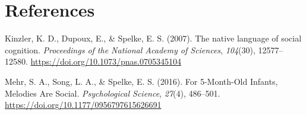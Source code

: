 \documentclass[
  english,
  man]{apa6}
\begin{document}
\newpage

\hypertarget{references}{%
\section{References}\label{references}}

\begingroup
\setlength{\parindent}{-0.5in}
\setlength{\leftskip}{0.5in}

\hypertarget{refs}{}
\leavevmode\hypertarget{ref-kinzler_native_2007}{}%
Kinzler, K. D., Dupoux, E., \& Spelke, E. S. (2007). The native language of social cognition. \emph{Proceedings of the National Academy of Sciences}, \emph{104}(30), 12577--12580. \url{https://doi.org/10.1073/pnas.0705345104}

\leavevmode\hypertarget{ref-mehr_for_2016}{}%
Mehr, S. A., Song, L. A., \& Spelke, E. S. (2016). For 5-Month-Old Infants, Melodies Are Social. \emph{Psychological Science}, \emph{27}(4), 486--501. \url{https://doi.org/10.1177/0956797615626691}

\endgroup
\end{document}
